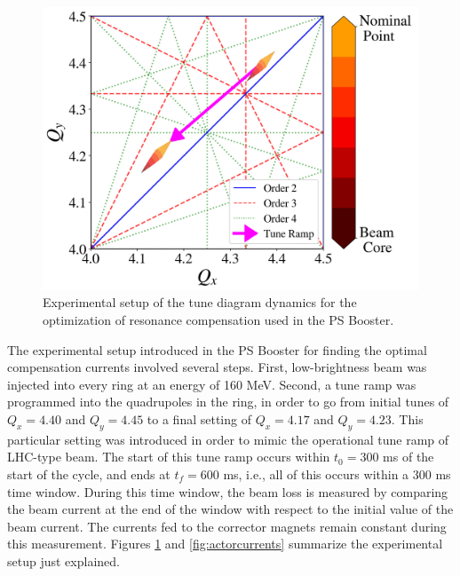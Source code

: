 \begin{figure}[H]
    \centering
    \includegraphics[width=\linewidth]{chapter5/experiment.png}
    \caption{Experimental setup of the tune diagram dynamics for the optimization of resonance compensation used in the PS Booster.}
    \label{fig:experimentPSB}
\end{figure}

The experimental setup introduced in the PS Booster for finding the optimal compensation currents involved several steps. First, low-brightness beam was injected into every ring at an energy of 160 MeV. Second, a tune ramp was programmed into the quadrupoles in the ring, in order to go from initial tunes of $Q_x = 4.40$ and $Q_y = 4.45$ to a final setting of $Q_x = 4.17$ and $Q_y = 4.23$. This particular setting was introduced in order to mimic the operational tune ramp of LHC-type beam. The start of this tune ramp occurs within $t_0 = 300$ ms of the start of the cycle, and ends at $t_f = 600$ ms, i.e., all of this occurs within a 300 ms time window. During this time window, the beam loss is measured by comparing the beam current at the end of the window with respect to the initial value of the beam current. The currents fed to the corrector magnets remain constant during this measurement. Figures \ref{fig:experimentPSB} and \ref{fig:actorcurrents} summarize the experimental setup just explained. 

